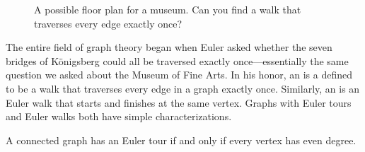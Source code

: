 \begin{figure}



\caption{A possible floor plan for a museum. Can you find a walk that
  traverses every edge exactly once?}

\label{fig:5BC}

\end{figure}

The entire field of graph theory began when Euler asked whether the
seven bridges of K\"onigsberg could all be traversed exactly
once---essentially the same question we asked about the Museum of Fine
Arts.  In his honor, an  is a defined to be a walk
that traverses every edge in a graph exactly once.  Similarly, an
 is an Euler walk that starts and finishes at the
same vertex.  Graphs with Euler tours and Euler walks both have simple
characterizations.
\begin{theorem}\label{thm:euler-tour}
A connected graph has an Euler tour if and only if every vertex has
even degree.
\end{theorem}

